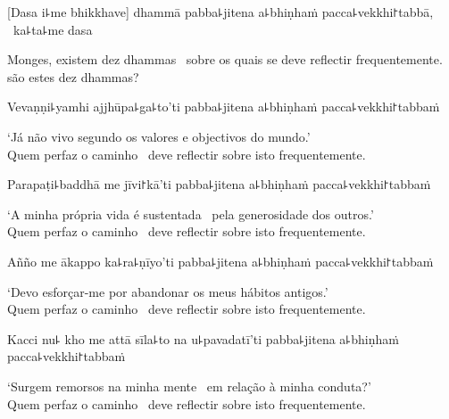 
\begin{leader}
\end{leader}

[Dasa i꜕me bhikkhave] dhammā pabba꜕jitena a꜕bhiṇhaṁ pacca꜕vekkhi꜓tabbā, \pause\ ka꜕ta꜕me dasa

\begin{english}
  Monges, existem dez dhammas \pause\ sobre os quais se deve reflectir frequentemente. \pause\  são estes dez dhammas?
\end{english}

Vevaṇṇi꜕yamhi ajjhūpa꜕ga꜕to'ti pabba꜕jitena a꜕bhiṇhaṁ pacca꜕vekkhi꜓tabbaṁ

\begin{english}
  `Já não vivo segundo os valores e objectivos do mundo.' \pause\\
  Quem perfaz o caminho \pause\ deve reflectir sobre isto frequentemente.
\end{english}

Parapaṭi꜕baddhā me jīvi꜓kā'ti pabba꜕jitena a꜕bhiṇhaṁ pacca꜕vekkhi꜓tabbaṁ

\begin{english}
  `A minha própria vida é sustentada \pause\ pela generosidade dos outros.' \pause\\
  Quem perfaz o caminho \pause\ deve reflectir sobre isto frequentemente.
\end{english}

Añño me ākappo ka꜕ra꜕ṇīyo'ti pabba꜕jitena a꜕bhiṇhaṁ pacca꜕vekkhi꜓tabbaṁ

\begin{english}
  `Devo esforçar-me por abandonar os meus hábitos antigos.' \pause\\
  Quem perfaz o caminho \pause\ deve reflectir sobre isto frequentemente.
\end{english}

\clearpage

Kacci nu꜕ kho me attā sīla꜕to na u꜕pavadatī'ti pabba꜕jitena a꜕bhiṇhaṁ pacca꜕vekkhi꜓tabbaṁ

\begin{english}
  `Surgem remorsos na minha mente \pause\ em relação à minha conduta?' \pause\\
  Quem perfaz o caminho \pause\ deve reflectir sobre isto frequentemente.
\end{english}

